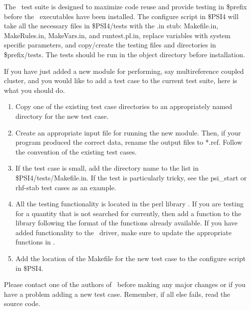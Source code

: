 The \PSIfour\ test suite is designed to maximize code reuse and
provide testing in \$prefix before the \PSIfour\
executables have been installed. The configure script in \$PSI4 
will take all the necessary files in \$PSI4/tests
with the .in stub: Makefile.in, MakeRules.in, MakeVars.in,
and runtest.pl.in, replace variables with system specific parameters,
and copy/create the testing files and directories in \$prefix/tests.
The tests should be run in the object directory before installation.

If you have just added a new module for performing, say multireference 
coupled cluster, and you would like to add a test case to the current 
test suite, here is what you should do.  
\begin{enumerate}
\item Copy one of the existing test case directories to an 
      appropriately named directory for the new test case.

\item Create an appropriate input file for running the new module. 
      Then, if your program produced the correct data, rename
      the output files to *.ref. Follow the convention of the 
      existing test cases.

\item If the test case is small, add the directory name to the list
      in \$PSI4/tests/Makefile.in.  If the test is particularly tricky,
      see the psi\_start or rhf-stab test cases as an example.

\item All the testing functionality is located in the perl library
      \file{runtest.pl.in}. If you are testing for a quantity that
      is not searched for currently, then add a function to the 
      library following the format of the functions already available.
      If you have added functionality to the \PSIfour\ driver,
      make sure to update the appropriate functions in .

\item Add the location of the Makefile for the new test case
      to the configure script in \$PSI4.

\end{enumerate}

Please contact one of the authors of \PSIfour\ before making any
major changes or if you have a problem adding a new test case.
Remember, if all else fails, read the source code.

